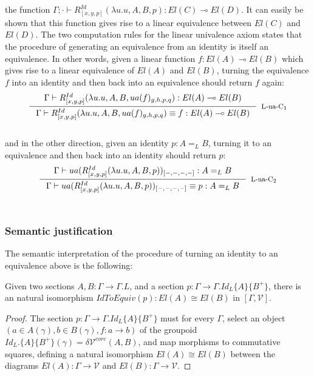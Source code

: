     the function $\Gamma; \cdot \vdash R^{Id}_{[x, y, p]}(\lambda u.u, A, B, p) : El(C) \multimap El(D)$.
    It can easily be shown that this function gives rise to a linear equivalence between $El(C)$ and $El(D)$.
    The two computation rules for the linear univalence axiom states that the procedure of generating an equivalence from an identity is itself an equivalence. In other words, given a linear function $f : El(A) \multimap El(B)$ which gives rise to a linear equivalence of $El(A)$ and $El(B)$, turning the equivalence $f$ into an identity and then back into an equivalence should return $f$ again:
  \[
    \inference{
      \Gamma \vdash R^{Id}_{[x, y, p]}(\lambda u.u, A, B, ua(f)_{g, h, p, q}) : El(A) \multimap El(B)}
    {\Gamma \vdash R^{Id}_{[x, y, p]}(\lambda u.u, A, B, ua(f)_{g, h, p, q}) \equiv f : El(A) \multimap El(B)}
    [L-ua-C$_1$]
  \]\\
  and in the other direction, given an identity $p : A =_L B$, turning it to an equivalence and then back into an identity should return $p$:
    \[
    \inference{
      \Gamma \vdash ua(R^{Id}_{[x, y, p]}(\lambda u.u, A, B, p))_{[-,-,-,-]} : A =_L B}
    {\Gamma \vdash ua(R^{Id}_{[x, y, p]}(\lambda u.u, A, B, p))_{[-,-,-,-]} \equiv p : A =_L B}
    [L-ua-C$_2$]
  \]\\
  \subsubsection{Semantic justification}
  The semantic interpretation of the procedure of turning an identity to an equivalence above is the following:
  \begin{lemm}Given two sections $A, B : \Gamma \to \Gamma.L$, and a section $p : \Gamma \to \Gamma.Id_L\{A\}\{B^+\}$, there is an natural isomorphism $IdToEquiv(p) : El(A) \cong El(B)$ in $[\Gamma, \mathcal{V}]$.
    \begin{proof}The section $p : \Gamma \to \Gamma.Id_L\{A\}\{B^+\}$ must for every $\Gamma$, select an object $(a \in A(\gamma), b \in B(\gamma), f : a \to b)$ of the groupoid $Id_L.\{A\}\{B^+\}(\gamma) = \delta \mathcal{V}^{core}(A,B)$, and map morphisms to commutative squares, defining a natural isomorphism $El(A) \cong El(B)$ between the diagrams $El(A) : \Gamma \to \mathcal{V}$ and $El(B) : \Gamma \to \mathcal{V}$.
    \end{proof}
  \end{lemm}
 
